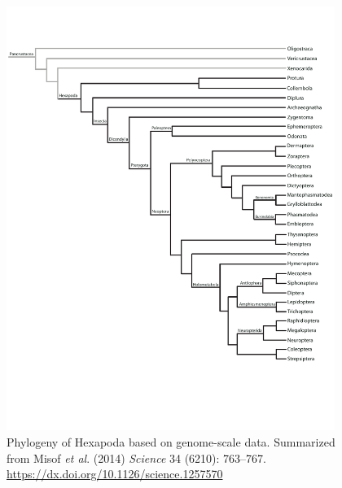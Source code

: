 \documentclass{article}
\begin{document}
\begin{figure}[ht!]
    \includegraphics[width=0.95\textwidth]{phylogeny}
\caption*{Phylogeny of Hexapoda based on genome-scale data. Summarized from Misof \textit{et al}. (2014) \textit{Science} 34 (6210): 763--767. \url{https://dx.doi.org/10.1126/science.1257570}}
\end{figure}
\end{document}
